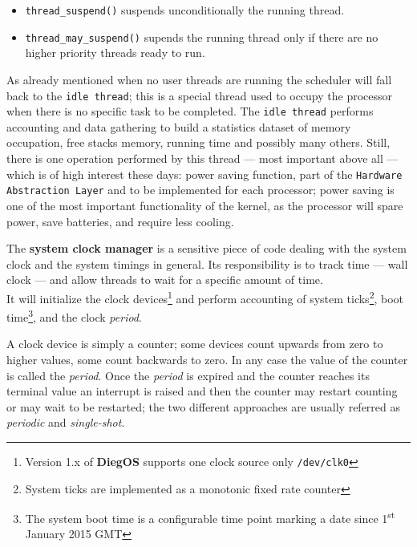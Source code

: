 \documentclass[11pt,b5paper]{scrbook}
\newcommand{\myOS}{{\color{SteelBlue}\textbf{DiegOS}}}
\begin{document}
\hfill
\begin{tcolorbox}[enhanced, colframe=YellowGreen!80!White, leftrule=3mm, top=5mm, bottom=5mm, halign=center, drop fuzzy shadow]
\begin{itemize}
\item \texttt{thread\_suspend()} suspends unconditionally the running thread.
\item \texttt{thread\_may\_suspend()} supends the running thread only if there are no higher priority threads ready to run.
\end{itemize}
\end{tcolorbox}
\hfill

As already mentioned when no user threads are running the scheduler will fall back to the 
\texttt{idle thread}; this is a special thread used to occupy the processor when there is no
specific task to be completed.
The \texttt{idle thread} performs accounting and data gathering to build a statistics dataset
of memory occupation, free stacks memory, running time and possibly many others.
Still, there is one operation performed by this thread --- most important above all --- which is of high interest
these days: power saving function, part of the \texttt{Hardware Abstraction Layer}
and to be implemented for each processor; power saving is one of the most
important functionality of the kernel, as the processor will spare power, save
batteries, and require less cooling.

The \textbf{system clock manager} is a sensitive piece of code dealing with
the system clock and the system timings in general.
Its responsibility is to track time --- wall clock --- and allow threads to wait for a specific amount
of time.\\
It will initialize the clock devices\footnote{Version 1.x of {\myOS} supports
one clock source only \texttt{/dev/clk0}} and perform accounting of system
ticks\footnote{System ticks are implemented as a monotonic fixed rate counter},
boot time\footnote{The system boot time is a configurable time point marking a date
since 1\textsuperscript{st} January 2015 GMT}, and the clock \textit{period}.

A clock device is simply a counter; some devices count upwards from zero to higher values,
some count backwards to zero. In any case the value of the counter is called the \textit{period}.
Once the \textit{period} is expired and the counter reaches its terminal value an interrupt is raised
and then the counter may restart counting or may wait to be restarted;
the two different approaches are usually referred as \textit{periodic} and \textit{single-shot}.
\end{document}
